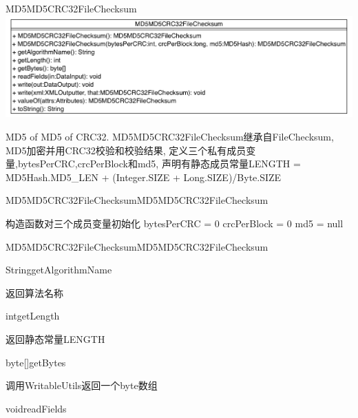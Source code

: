 \begin{XeClass}{MD5MD5CRC32FileChecksum}
\includegraphics[width=\textwidth]{cdig/MD5MD5CRC32FileChecksum.png}
     
 MD5 of MD5 of CRC32.
 MD5MD5CRC32FileChecksum继承自FileChecksum,
 MD5加密并用CRC32校验和校验结果,
 定义三个私有成员变量,bytesPerCRC,crcPerBlock和md5,
 声明有静态成员常量LENGTH = MD5Hash.MD5_LEN + (Integer.SIZE + Long.SIZE)/Byte.SIZE

    \begin{XeMethod}{\XePublic}{MD5MD5CRC32FileChecksum}{MD5MD5CRC32FileChecksum}
         
 构造函数对三个成员变量初始化
 bytesPerCRC = 0
 crcPerBlock = 0
 md5 = null

    \end{XeMethod}

    \begin{XeMethod}{\XePublic}{MD5MD5CRC32FileChecksum}{MD5MD5CRC32FileChecksum}
         

    \end{XeMethod}

    \begin{XeMethod}{\XePublic}{String}{getAlgorithmName}
         
 返回算法名称

    \end{XeMethod}

    \begin{XeMethod}{\XePublic}{int}{getLength}
         
 返回静态常量LENGTH

    \end{XeMethod}

    \begin{XeMethod}{\XePublic}{byte[]}{getBytes}
         
 调用WritableUtils返回一个byte数组

    \end{XeMethod}

    \begin{XeMethod}{\XePublic}{void}{readFields}
         

\end{XeMethod}
\end{XeClass}

